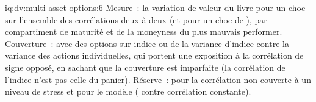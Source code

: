 \begin{solution}{iq:dv:multi-asset-options:6}
Mesure~: la variation de valeur du livre pour un choc sur l'ensemble des corrélations deux à deux (et pour un choc de ), par compartiment de maturité
et de la moneyness du plus mauvais performer. Couverture~: avec des options sur indice ou de la variance d'indice contre la variance des actions individuelles, qui portent
une exposition à la corrélation de signe opposé, en sachant que la couverture est imparfaite (la corrélation de l'indice n'est pas celle du panier). Réserve~: pour la
corrélation non couverte à un niveau de stress et pour le modèle ( contre corrélation constante).
\end{solution}
